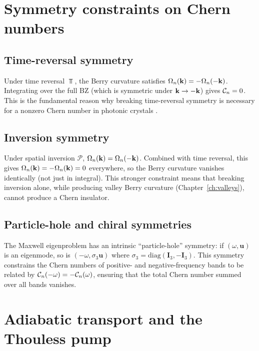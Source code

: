 \section{Symmetry constraints on Chern numbers}
\label{sec:ch5-symmetry-constraints}

\subsection{Time-reversal symmetry}
\label{sec:ch5-TR-constraint}

Under time reversal $\Top$, the Berry curvature satisfies
$\Omega_n(\mathbf{k})=-\Omega_n(-\mathbf{k})$.  Integrating over the full BZ
(which is symmetric under $\mathbf{k}\to-\mathbf{k}$) gives $\mathcal{C}_n=0$.
This is the fundamental reason why breaking time-reversal symmetry
is necessary for a nonzero Chern number in photonic crystals
\cite{haldane2008possible,ozawa2018topological}.

\subsection{Inversion symmetry}
\label{sec:ch5-P-constraint}

Under spatial inversion $\mathcal{P}$,
$\Omega_n(\mathbf{k})=\Omega_n(-\mathbf{k})$.  Combined with time reversal,
this gives $\Omega_n(\mathbf{k})=-\Omega_n(\mathbf{k})=0$ everywhere, so the
Berry curvature vanishes identically (not just in integral).  This
stronger constraint means that breaking inversion alone, while
producing valley Berry curvature (Chapter~\ref{ch:valleys}), cannot
produce a Chern insulator.

\subsection{Particle-hole and chiral symmetries}
\label{sec:ch5-chiral-constraint}

The Maxwell eigenproblem has an intrinsic ``particle-hole'' symmetry:
if $(\omega,\mathbf{u})$ is an eigenmode, so is $(-\omega,\sigma_3\mathbf{u})$
where $\sigma_3=\mathrm{diag}(\mathbf{I}_3,-\mathbf{I}_3)$.  This
symmetry constrains the Chern numbers of positive- and
negative-frequency bands to be related by
$\mathcal{C}_n(-\omega)=-\mathcal{C}_n(\omega)$, ensuring that the total Chern
number summed over all bands vanishes.

\section{Adiabatic transport and the Thouless pump}
\label{sec:ch5-adiabatic}

